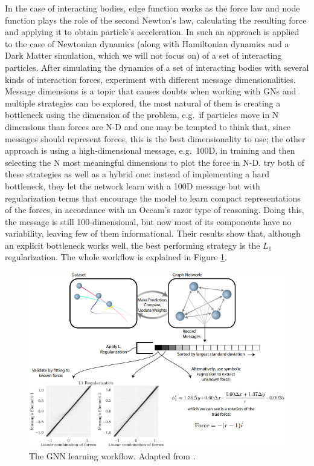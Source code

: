 \documentclass[../../master_thesis_np.tex]{subfiles}
\begin{document}
	In the case of interacting bodies, edge function works as the force law and node function plays the role of the second Newton's law, calculating the resulting force and applying it to obtain particle's acceleration. 
	In \cite{cranmer_discovering_2020} such an approach is applied to the case of Newtonian dynamics (along with Hamiltonian dynamics and a Dark Matter simulation, which we will not focus on) of a set of interacting particles. 
	After simulating the dynamics of a set of interacting bodies with several kinds of interaction forces, \citeauthor{cranmer_discovering_2020} experiment with different message dimensionalities. 
	Message dimensions is a topic that causes doubts when working with GNs and multiple strategies can be explored, the most natural of them is creating a bottleneck using the dimension of the problem, e.g.~if particles move in N dimensions than forces are N-D and one may be tempted to think that, since messages should represent forces, this is the best dimensionality to use; the other approach is using a high-dimensional message, e.g.~100D, in training and then selecting the N most meaningful dimensions to plot the force in N-D. 
	\citeauthor{cranmer_discovering_2020} try both of these strategies as well as a hybrid one: instead of implementing a hard bottleneck, they let the network learn with a 100D message but with regularization terms that encourage the model to learn compact representations of the forces, in accordance with an Occam's razor type of reasoning. 
	Doing this, the message is still 100-dimensional, but now most of its components have no variability, leaving few of them informational. 
	Their results show that, although an explicit bottleneck works well, the best performing strategy is the $L_1$ regularization. 
	The whole workflow is explained in Figure \ref{fig:cranmer1}.
	
	 \begin{figure}[htp]
		\centering
		\includegraphics[width=\singfigwidth]{cranmer1.png}
		\caption{The GNN learning workflow. Adapted from \cite{cranmer_discovering_2020}.}
		\label{fig:cranmer1}
	\end{figure}
	
\end{document}
